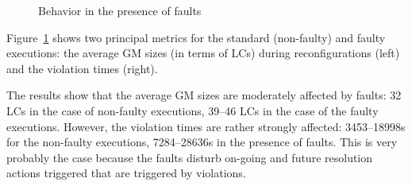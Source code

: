 


\begin{figure}[htbp]
\subcapcentertrue
{}
\caption{Behavior in the presence of faults}
\label{fig:snoozeFaults}
\end{figure}


Figure~\ref{fig:snoozeFaults} shows two principal metrics for the
standard (non-faulty) and faulty executions: the average GM sizes (in
terms of LCs) during reconfigurations (left) and the violation times
(right).

The results show that the average GM sizes are moderately affected by
faults: 32 LCs in the case of non-faulty executions, 39--46 LCs in the
case of the faulty executions. However, the violation times are rather
strongly affected: 3453--18998s for the non-faulty executions,
7284--28636s in the presence of faults. This is very probably the case
because the faults disturb on-going and future resolution actions
triggered that are triggered by violations.



